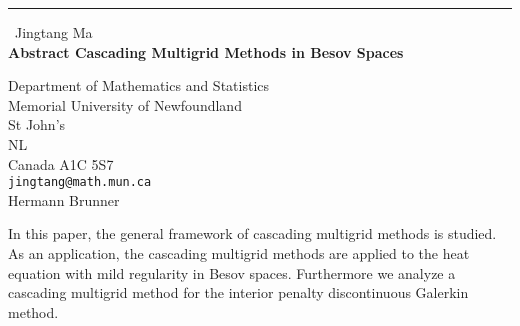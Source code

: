 \documentclass{report}
\begin{document}
\begin{center}
\rule{6in}{1pt} \
{\large Jingtang Ma \\
{\bf Abstract Cascading Multigrid Methods in Besov Spaces}}

Department of Mathematics and Statistics \\ Memorial University of Newfoundland \\ St John's \\ NL \\ Canada A1C 5S7
\\
{\tt jingtang@math.mun.ca}\\
Hermann Brunner\end{center}

In this paper, the general framework of cascading
multigrid methods is studied. As an application, the cascading
multigrid methods are applied to the heat equation with mild
regularity in Besov spaces. Furthermore we analyze a cascading
multigrid method for the interior penalty discontinuous Galerkin
method.
\end{document}
